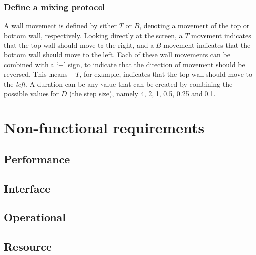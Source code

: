 \subsubsection{Define a mixing protocol}
A wall movement is defined by either $T$ or $B$, denoting a movement of the top or bottom wall, respectively. Looking directly at the screen, a $T$ movement indicates that the top wall should move to the right, and a $B$ movement indicates that the bottom wall should move to the left. Each of these wall movements can be combined with a `$-$' sign, to indicate that the direction of movement should be reversed. This means $-T$, for example, indicates that the top wall should move to the \emph{left}. A duration can be any value that can be created by combining the possible values for $D$ (the step size), namely 4, 2, 1, 0.5, 0.25 and 0.1.

\section{Non-functional requirements}
\label{sec:nonfuncreq}

\subsection{Performance}



\subsection{Interface}



\subsection{Operational}
\subsection{Resource}
